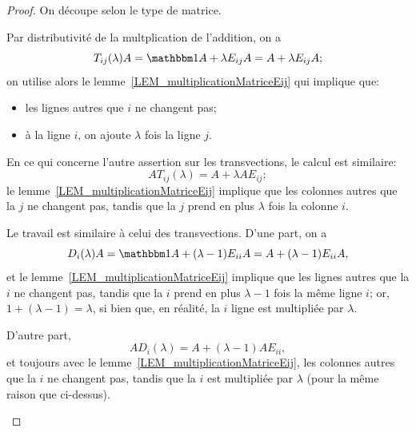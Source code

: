 \begin{proof}
On découpe selon le type de matrice.
\begin{subproof}
  \item[Pour les transvections]
    Par distributivité de la multplication de l'addition, on a
    \begin{equation}
        T_{ij}(\lambda)A = \mtu A+\lambda E_{ij}A = A+\lambda E_{ij}A;
    \end{equation}
    on utilise alors le lemme~\ref{LEM_multiplicationMatriceEij} qui implique que:
    \begin{itemize}
    \item
      les lignes autres que \( i \) ne changent pas;
    \item
      à la ligne \(i \), on ajoute \( \lambda\) fois la ligne \( j\).
    \end{itemize}

    En ce qui concerne l'autre assertion sur les transvections, le calcul est similaire:
    \begin{equation}
        AT_{ij}(\lambda) = A+\lambda A E_{ij};
    \end{equation}
    le lemme~\ref{LEM_multiplicationMatriceEij} implique que les colonnes autres que la \( j\)\ieme{} ne changent pas, tandis que la \( j\)\ieme{} prend en plus \( \lambda\) fois la colonne \( i\).
  
  \item[Pour les dilatations]
    Le travail est similaire à celui des transvections. D'une part, on a
    \begin{equation}
        D_i(\lambda)A=\mtu A+(\lambda-1)E_{ii} A =  A+(\lambda-1)E_{ii} A,
    \end{equation}
    et le lemme~\ref{LEM_multiplicationMatriceEij} implique que les lignes autres que la \( i\)\ieme{} ne changent pas, tandis que la \( i \)\ieme{} prend en plus \( \lambda - 1\) fois la même ligne \( i\); or, \( 1 + (\lambda - 1) = \lambda\), si bien que, en réalité, la \( i \)\ieme{} ligne est multipliée par \( \lambda \).
    
    D'autre part, 
    \begin{equation}
        AD_i(\lambda)= A+(\lambda-1)A E_{ii},
    \end{equation}
    et toujours avec le lemme~\ref{LEM_multiplicationMatriceEij}, les colonnes autres que la \( i\)\ieme{} ne changent pas, tandis que la \( i \)\ieme{} est multipliée par \( \lambda \) (pour la même raison que ci-dessus).
    

\end{subproof}
\end{proof}
